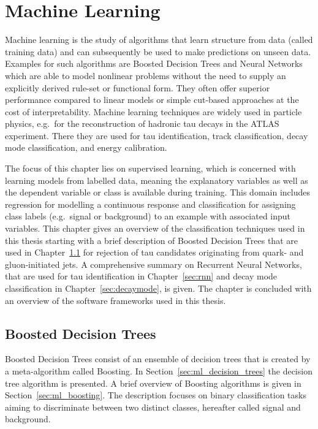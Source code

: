 \chapter{Machine Learning}
\label{sec:ml}

Machine learning is the study of algorithms that learn structure from data
(called training data) and can subsequently be used to make predictions on
unseen data. Examples for such algorithms are Boosted Decision Trees and Neural
Networks which are able to model nonlinear problems without the need to supply
an explicitly derived rule-set or functional form. They often offer superior
performance compared to linear models or simple cut-based approaches at the cost
of interpretability. Machine learning techniques are widely used in particle
physics, e.g.\ for the reconstruction of hadronic tau decays in the ATLAS
experiment. There they are used for tau identification, track classification,
decay mode classification, and energy calibration.

The focus of this chapter lies on supervised learning, which is concerned with
learning models from labelled data, meaning the explanatory variables as well as
the dependent variable or class is available during training. This domain
includes regression for modelling a continuous response and classification for
assigning class labels (e.g.\ signal or background) to an example with
associated input variables. This chapter gives an overview of the classification
techniques used in this thesis starting with a brief description of Boosted
Decision Trees that are used in Chapter~\ref{sec:bdt} for rejection of tau
candidates originating from quark- and gluon-initiated jets. A comprehensive
summary on Recurrent Neural Networks, that are used for tau identification in
Chapter~\ref{sec:rnn} and decay mode classification in
Chapter~\ref{sec:decaymode}, is given. The chapter is concluded with an overview
of the software frameworks used in this thesis.

\section{Boosted Decision Trees}
\label{sec:bdt}

Boosted Decision Trees consist of an ensemble of decision trees that is created
by a meta-algorithm called Boosting. In Section~\ref{sec:ml_decision_trees} the
decision tree algorithm is presented. A brief overview of Boosting algorithms is
given in Section~\ref{sec:ml_boosting}. The description focuses on binary
classification tasks aiming to discriminate between two distinct classes,
hereafter called signal and background.

